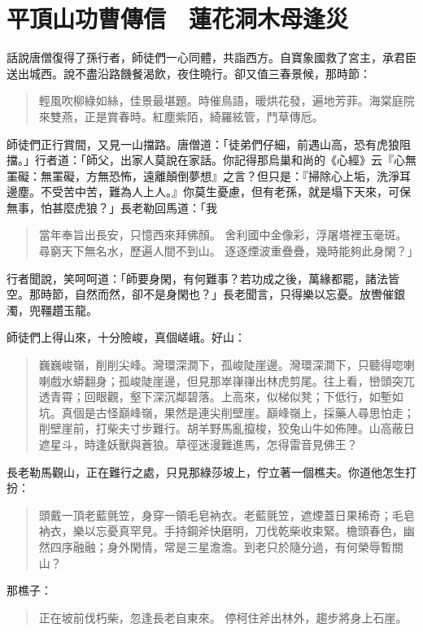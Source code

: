 
\chapter{平頂山功曹傳信　蓮花洞木母逢災}

話說唐僧復得了孫行者，師徒們一心同體，共詣西方。自寶象國救了宮主，承君臣送出城西。說不盡沿路饑餐渴飲，夜住曉行。卻又值三春景候，那時節：
\begin{quote}
輕風吹柳綠如絲，佳景最堪題。時催鳥語，暖烘花發，遍地芳菲。海棠庭院來雙燕，正是賞春時。紅塵紫陌，綺羅絃管，鬥草傳卮。
\end{quote}

師徒們正行賞間，又見一山擋路。唐僧道：「徒弟們仔細，前遇山高，恐有虎狼阻擋。」行者道：「師父，出家人莫說在家話。你記得那烏巢和尚的《心經》云『心無罣礙：無罣礙，方無恐怖，遠離顛倒夢想』之言？但只是：『掃除心上垢，洗淨耳邊塵。不受苦中苦，難為人上人。』你莫生憂慮，但有老孫，就是塌下天來，可保無事，怕甚麼虎狼？」長老勒回馬道：「我
\begin{quote}
當年奉旨出長安，只憶西來拜佛顏。
舍利國中金像彩，浮屠塔裡玉毫斑。
尋窮天下無名水，歷遍人間不到山。
逐逐煙波重疊疊，幾時能夠此身閑？」
\end{quote}

行者聞說，笑呵呵道：「師要身閑，有何難事？若功成之後，萬緣都罷，諸法皆空。那時節，自然而然，卻不是身閑也？」長老聞言，只得樂以忘憂。放轡催銀濁，兜韁趲玉龍。

師徒們上得山來，十分險峻，真個嵯峨。好山：
\begin{quote}
巍巍峻嶺，削削尖峰。灣環深澗下，孤峻陡崖邊。灣環深澗下，只聽得唿喇喇戲水蟒翻身；孤峻陡崖邊，但見那崒嵂嵂出林虎剪尾。往上看，巒頭突兀透青霄；回眼觀，壑下深沉鄰碧落。上高來，似梯似凳；下低行，如塹如坑。真個是古怪巔峰嶺，果然是連尖削壁崖。巔峰嶺上，採藥人尋思怕走；削壁崖前，打柴夫寸步難行。胡羊野馬亂攛梭，狡兔山牛如佈陣。山高蔽日遮星斗，時逢妖獸與蒼狼。草徑迷漫難進馬，怎得雷音見佛王？
\end{quote}

長老勒馬觀山，正在難行之處，只見那綠莎坡上，佇立著一個樵夫。你道他怎生打扮：
\begin{quote}
頭戴一頂老藍氈笠，身穿一領毛皂衲衣。老藍氈笠，遮煙蓋日果稀奇；毛皂衲衣，樂以忘憂真罕見。手持鋼斧快磨明，刀伐乾柴收束緊。檐頭春色，幽然四序融融；身外閑情，常是三星澹澹。到老只於隨分過，有何榮辱暫關山？
\end{quote}

那樵子：
\begin{quote}
正在坡前伐朽柴，忽逢長老自東來。
停柯住斧出林外，趨步將身上石崖。
\end{quote}

